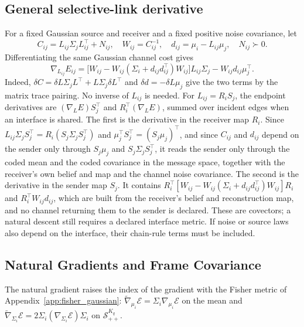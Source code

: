 \subsection*{General selective-link derivative}

For a fixed Gaussian source and receiver and a fixed positive noise covariance, let
\[
C_{ij}=L_{ij}\Sigma_jL_{ij}^{\top}+N_{ij},\quad
W_{ij}=C_{ij}^{-1},\quad d_{ij}=\mu_i-L_{ij}\mu_j,\quad N_{ij}\succ0.
\]
Differentiating the same Gaussian channel cost gives
\begin{equation}
\nabla_{L_{ij}}E_{ij}
=\big[W_{ij}-W_{ij}(\Sigma_i+d_{ij}d_{ij}^{\top})W_{ij}\big]L_{ij}\Sigma_j
-W_{ij}d_{ij}\mu_j^{\top}.
\label{eq:selective_link_matrix_gradient}
\end{equation}
Indeed, $\delta C=\delta L\Sigma_jL^\top+L\Sigma_j\delta L^\top$ and $\delta d=-\delta L\mu_j$ give the two terms by the matrix trace pairing. No inverse of $L_{ij}$ is needed. For $L_{ij}=R_iS_j$, the endpoint derivatives are $(\nabla_LE)S_j^\top$ and $R_i^\top(\nabla_LE)$, summed over incident edges when an interface is shared. The first is the derivative in the receiver map $R_i$. Since $L_{ij}\Sigma_jS_j^\top=R_i(S_j\Sigma_jS_j^\top)$ and $\mu_j^\top S_j^\top=(S_j\mu_j)^\top$, and since $C_{ij}$ and $d_{ij}$ depend on the sender only through $S_j\mu_j$ and $S_j\Sigma_jS_j^\top$, it reads the sender only through the coded mean and the coded covariance in the message space, together with the receiver's own belief and map and the channel noise covariance. The second is the derivative in the sender map $S_j$. It contains $R_i^\top[W_{ij}-W_{ij}(\Sigma_i+d_{ij}d_{ij}^\top)W_{ij}]R_i$ and $R_i^\top W_{ij}d_{ij}$, which are built from the receiver's belief and reconstruction map, and no channel returning them to the sender is declared. These are covectors; a natural descent still requires a declared interface metric. If noise or source laws also depend on the interface, their chain-rule terms must be included.

\subsection*{Natural Gradients and Frame Covariance}

The natural gradient raises the index of the gradient with the Fisher metric of Appendix~\ref{app:fisher_gaussian}: $\tilde{\nabla}_{\mu_i} \mathcal{E} = \Sigma_i \nabla_{\mu_i} \mathcal{E}$ on the mean and $\tilde{\nabla}_{\Sigma_i} \mathcal{E} = 2\Sigma_i (\nabla_{\Sigma_i} \mathcal{E}) \Sigma_i$ on $\mathcal{S}_{++}^{K_q}$.


